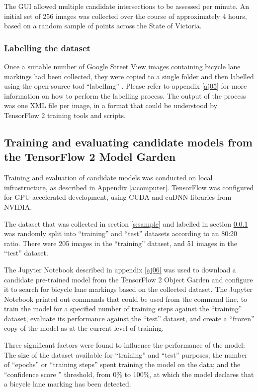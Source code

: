 \documentclass[11pt,twoside]{report}
\begin{document}
The GUI allowed multiple candidate intersections to be assessed per minute.  An initial set of 256 images was collected over the course of approximately 4 hours, based on a random sample of points across the State of Victoria.


\subsubsection{Labelling the dataset}
\label{s:label}

Once a suitable number of Google Street View images containing bicycle lane markings had been collected, they were copied to a single folder and then labelled using the open-source tool ``labelImg'' \cite{labelImg}.  Please refer to appendix \ref{aj05} for more information on how to perform the labelling process.  The output of the process was one XML file per image, in a format that could be understood by TensorFlow 2 training tools and scripts.

\subsection{Training and evaluating candidate models from the TensorFlow 2 Model Garden}

Training and evaluation of candidate models was conducted on local infrastructure, as described in Appendix \ref{a:computer}.  TensorFlow was configured for GPU-accelerated development, using CUDA and cuDNN libraries from NVIDIA.

The dataset that was collected in section \ref{s:sample} and labelled in section \ref{s:label} was randomly split into ``training'' and ``test'' datasets according to an 80:20 ratio.  There were 205 images in the ``training'' dataset, and 51 images in the ``test'' dataset.

The Jupyter Notebook described in appendix \ref{aj06} was used to download a candidate pre-trained model from the TensorFlow 2 Object Garden and configure it to search for bicycle lane markings based on the collected dataset.  The Jupyter Notebook printed out commands that could be used from the command line, to train the model for a specified number of training steps against the ``training'' dataset, evaluate its performance against the ``test'' dataset, and create a ``frozen'' copy of the model as-at the current level of training.

Three significant factors were found to influence the performance of the model:  The size of the dataset available for ``training'' and ``test'' purposes; the number of ``epochs'' or ``training steps'' spent training the model on the data; and the ``confidence score '' threshold, from 0\% to 100\%, at which the model declares that a bicycle lane marking has been detected.
\end{document}
